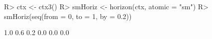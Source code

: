 \begin{Schunk}
% --begin: "horizon"
\begin{Sinput}
R> ctx <- ctx3()
R> smHoriz <- horizon(ctx, atomic = "sm")
R> smHoriz(seq(from = 0, to = 1, by = 0.2))
\end{Sinput}
\begin{Soutput}
[1] 1.0 0.6 0.2 0.0 0.0 0.0
\end{Soutput}
%
% --end: "horizon"
\end{Schunk}
